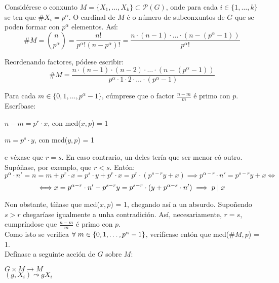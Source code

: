 \documentclass[twoside]{report}
\theoremstyle{mystyle}
\begin{document}
\noindent Considérese o conxunto $M = \{X_{1}, \dots, X_{k}\} \subset \mathcal{P}(G)$, onde para cada $i \in \{1, \dots, k\}$ se ten que $\#X_{i} = p^{\alpha}$. O cardinal de $M$ é o número de subconxuntos de $G$ que se poden formar con $p^{\alpha}$ elementos. Así:
$$\#M = \binom{n}{p^{\alpha}} = \displaystyle \frac{n!}{p^{\alpha}!(n-p^{\alpha})!} = \displaystyle \frac{n \cdot (n-1) \cdot \dots \cdot (n - (p^{\alpha} -1))}{p^{\alpha}!}$$

\noindent Reordenando factores, pódese escribir:
$$\#M = \displaystyle \frac{n \cdot (n-1) \cdot (n-2) \cdot \dots \cdot (n-(p^{\alpha}-1))}{p^{\alpha} \cdot 1 \cdot 2 \cdot \dots \cdot (p^{\alpha} - 1)}$$

\noindent Para cada $m \in \{0, 1, \dots, p^{\alpha} -1\}$, cúmprese que o factor $\displaystyle \frac{n-m}{m}$ é primo con $p$. Escríbase:
\begin{center}
$n - m = p^{r} \cdot x$, con mcd($x,p$) = 1\par
\vspace{3mm}
$m = p^{s} \cdot y$, con mcd($y,p$) = 1  
\end{center} 

\noindent e véxase que $r = s$. En caso contrario, un deles tería que ser menor có outro. Supóñase, por exemplo, que $r < s$. Entón:
$$p^{\alpha} \cdot n' = n = m + p^{r} \cdot x = p^{s} \cdot y + p^{r} \cdot x = p^{r} \cdot (p^{s-r}y + x) \implies p^{\alpha-r} \cdot n' = p^{s-r}y + x \Longleftrightarrow$$ 
$$ \Longleftrightarrow x = p^{\alpha - r} \cdot n' - p^{s-r}y = p^{s-r} \cdot (y + p^{\alpha - s}\cdot n') \implies p \hspace{1mm} | \hspace{1mm} x$$

\noindent Non obstante, tíñase que mcd($x,p$) = 1, chegando así a un absurdo. Supoñendo $s > r$ chegaríase igualmente a unha contradición. Así, necesariamente, $r = s$, cumpríndose que $\displaystyle \frac{n-m}{m}$ é primo con $p$.\\

\noindent Como isto se verifica $\forall \hspace{1mm} m \in \{0, 1, \dots, p^{\alpha} -1\}$, verifícase entón que mcd($\#M, p$) = 1.\\

\noindent Defínase a seguinte acción de $G$ sobre $M$: 

    \begin{center}
    $G \times M \longrightarrow M$ \\
    \vspace{2mm}
    \hspace{1mm} $(g,X_{i}) \leadsto gX_{i}$
    \end{center}  
    
\end{document}
